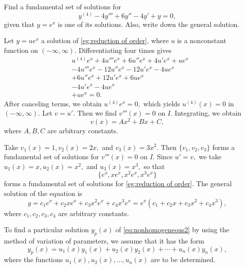 \begin{example}
	Find a fundamental set of solutions for  
	\begin{equation}\label{eg:reduction of order}
		y^{(4)}-4y'''+6y''-4y'+y=0, 
	\end{equation} given that $y= e^x$ is one of its  solutions. Also, write down the general solution.
\end{example}
\begin{solution}
	Let $y= ue^x$ a solution of \eqref{eg:reduction of order}, where $u$ is a nonconstant function on $(-\infty, \infty).$ Differentiating four times gives
	\[
		\begin{split}
			&u^{(4)}e^x+ 4u'''e^x+ 6u''e^x + 4u'e^x+ ue^x\\
			&-4u'''e^x -12u''e^x-12u'e^x -4 ue^x\\
			&+6u''e^x +12u'e^x+6 ue^x\\
			&-4u'e^x -4ue^x \\
			&+ue^x =0.
		\end{split}\]
		After canceling terms, we obtain \(u^{(4)}e^x=0,\) which yields \(u^{(4)}(x)=0\) in $(-\infty, \infty).$  Let $v= u'.$ Then we find
		\(v'''(x) = 0\) on $I.$
		Integrating, we obtain
		\[v(x) = Ax^2+ Bx + C,\] where $A, B, C$ are arbitrary constants.
		
		 Take $v_1(x) = 1, v_2(x)= 2x,$ and  $v_3(x)= 3x^2.$ Then $\{v_1, v_2, v_3\}$ forms  a fundamental set of solutions for  \(v'''(x) = 0\) on $I.$  Since $u'=v,$ we take $u_1(x) = x, u_2(x) = x^2,$ and  $u_3(x) =x^3,$ so that 
		\[\{e^x, xe^x, x^2e^x, x^3 e^x\}\] forms a fundamental set of solutions for  \eqref{eg:reduction of order}. The general solution of the equation is
		\[y= c_1e^x+c_2xe^x+c_3x^2e^x+c_4x^3 e^x = e^x(c_1+c_2x+c_3x^2+c_4x^3), \] where $c_1, c_2, c_3, c_4$ are arbitrary constants.
\end{solution}
	

	

	
	To find a particular solution \( y_p(x) \) of \eqref{eq:nonhomogeneous2} by using the method of variation of parameters, we assume that it has the form
	\begin{equation} \label{eq:particular}
		y_p(x) = u_1(x)y_1(x) + u_2(x)y_2(x) + \cdots + u_n(x)y_n(x),
	\end{equation}
	where the functions \( u_1(x), u_2(x), \dots, u_n(x) \) are to be determined.
	
